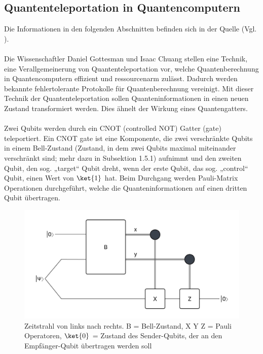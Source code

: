 \subsection{Quantenteleportation in Quantencomputern}
Die Informationen in den folgenden Abschnitten befinden sich in der Quelle (Vgl. \cite[S.1-2]{gottesman_quantum_1999}).\\
\\
Die Wissenschaftler Daniel Gottesman und Isaac Chuang stellen eine Technik, eine Verallgemeinerung von Quantenteleportation vor, welche Quantenberechnung in Quantencomputern effizient und ressourcenarm zulässt. Dadurch werden bekannte fehlertolerante Protokolle für Quantenberechnung vereinigt. Mit dieser Technik der Quantenteleportation sollen Quanteninformationen in einen neuen Zustand transformiert werden. Dies ähnelt der Wirkung eines Quantengatters.\\
\\
Zwei Qubits werden durch ein CNOT (controlled NOT) Gatter (gate) teleportiert. Ein CNOT gate ist eine Komponente, die zwei verschränkte Qubits in einem Bell-Zustand (Zustand, in dem zwei Qubits maximal miteinander verschränkt sind; mehr dazu in Subsektion 1.5.1) aufnimmt und den zweiten Qubit, den sog. „target“ Qubit dreht, wenn der erste Qubit, das sog. „control“ Qubit, einen Wert von \(\ket{1}\) hat. Beim Durchgang werden Pauli-Matrix Operationen durchgeführt, welche die Quanteninformationen auf einen dritten Qubit übertragen.\\
\begin{figure}[h!]
    \centering
    \includegraphics[width=1.0\textwidth]{images/quantum-information/quantenteleportation_cnot_1.jpeg}
    \caption{Zeitstrahl von links nach rechts. B = Bell-Zustand, X Y Z = Pauli Operatoren, \(\ket{0}\) = Zustand des Sender-Qubits, der an den Empfänger-Qubit übertragen werden soll}
    \label{fig:meinbild}
\end{figure}
